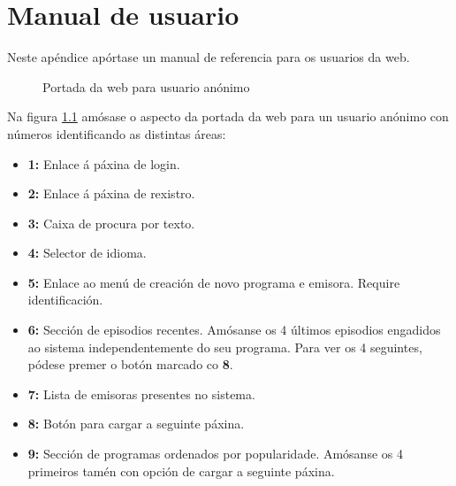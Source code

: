 \chapter[Apéndice: Manual de usuario]{
  \label{chp:usermanual}
  Manual de usuario
}

Neste apéndice apórtase un manual de referencia para os usuarios da web.

\begin{figure}[h]
	\centering
	\caption{Portada da web para usuario anónimo}
	\label{fig:um-index-anon}
\end{figure}

Na figura \ref{fig:um-index-anon} amósase o aspecto da portada da web para un usuario anónimo con números identificando as distintas áreas:

\begin{itemize}
	\item \textbf{1:} Enlace á páxina de login.
	\item \textbf{2:} Enlace á páxina de rexistro.
	\item \textbf{3:} Caixa de procura por texto.
	\item \textbf{4:} Selector de idioma.
	\item \textbf{5:} Enlace ao menú de creación de novo programa e emisora. Require identificación.
	\item \textbf{6:} Sección de episodios recentes. Amósanse os 4 últimos episodios engadidos ao sistema independentemente do seu programa. Para ver os 4 seguintes, pódese premer o botón marcado co \textbf{8}.
	\item \textbf{7:} Lista de emisoras presentes no sistema.
	\item \textbf{8:} Botón para cargar a seguinte páxina.
	\item \textbf{9:} Sección de programas ordenados por popularidade. Amósanse os 4 primeiros tamén con opción de cargar a seguinte páxina.  
\end{itemize}

